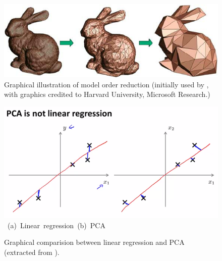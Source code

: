 \begin{figure}[ht] 
\vbox{\vspace{-1cm}
\centering
\includegraphics[width=.72\textwidth]{./Pics/Introduction/Graphical-illustration-of-model-order-reduction.png}
\vspace{0.cm}
\vspace{0.5cm}
}   
\caption{Graphical illustration of model order reduction (initially used by \citet{Schilders2008}, with graphics credited to Harvard University, Microsoft Research.)}
\vspace{1.5cm}
\label{fig:IllustrationMOR}
\end{figure}

\begin{figure}[ht] 
\vbox{\vspace{-1cm}
\centering
\includegraphics[width=.72\textwidth]{./Pics/PCA_LinReg/PCA_is_not_LinReg.png}
\vspace{0.cm}
\hbox{\hspace{0.25cm} (a) Linear regression \hspace{2cm} (b) PCA \hspace{3.0cm}}
\vspace{0.5cm}
}   
\caption{Graphical comparision between linear regression and PCA (extracted from \citet{AndrewNg_2018}).}
\vspace{1.5cm}
\label{fig:PCA_is_not_LinReg}
\end{figure}
\clearpage

